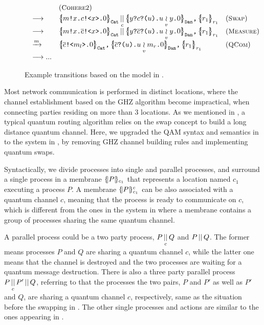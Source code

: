 \begin{figure}[t]
{\[\begin{array}{l}
\begin{array}{lll}
&
(\rulelab{Cohere2})
\\[0.3em]
\longrightarrow
&
\pard{\parll{\qcellb{\send{m}{x}{\csend{c}{x}{0}}}{\cn{Cat}}}{c}
{\qcellb{\rev{y}{\crev{c}{u}{\mer{u}{v}{y}{0}}}}{\cn{Dan}}}}
{\qcellb{r_1}{r_1}}
&
(\rulelab{Swap})
\\[0.3em]
\longrightarrow
&
\pard{\parl{\qcellb{\send{m}{x}{\csend{\overline{c}}{x}{0}}}{\cn{Cat}}}
{\qcellb{\rev{y}{\crev{\overline{c}}{u}{\mer{u}{v}{y}{0}}}}{\cn{Dan}}}}
{\qcellb{r_1}{r_1}}
&
(\rulelab{Measure})
\\[0.3em]
\xrightarrow{m}
&
\pard{\pard{\qcellb{\csend{\overline{c}}{m_l}{0}}{\cn{Cat}}}
{\qcellb{\crev{\overline{c}}{u}{\mer{u}{v}{m_r}{0}}}{\cn{Dan}}}}
{\qcellb{r_1}{r_1}}
&
(\rulelab{QCom})
\\[0.3em]
\longrightarrow...
\end{array}
\end{array}
\]
}
\caption{Example transitions based on the model in .}
  \label{fig:q-pi-example}
\end{figure}

Most network communication is performed in distinct locations,
where the channel establishment based on the GHZ algorithm become impractical, when connecting parties residing on more than $3$ locations. As we mentioned in , a typical quantum routing algorithm relies on the swap concept to build a long distance quantum channel. Here, we upgraded the QAM syntax and semantics in  to the system in , by removing GHZ channel building rules and implementing quantum swaps.

Syntactically, we divide processes into single and parallel processes, and surround a single process in a membrane $\{\!| P |\!\}_{c_1}$ that represents a location named $c_1$ executing a process $P$. A membrane $\{\!| P |\!\}_{c_1}^c$ can be also associated with a quantum channel $c$, meaning that the process is ready to communicate on $c$, which is different from the ones in the system in  where a membrane contains a group of processes sharing the same quantum channel.

A parallel process could be a two party process, $P\,\underset{c}{||}\,Q$ and $P\,||\,Q$.
The former means processes $P$ and $Q$ are sharing a quantum channel $c$, while the latter one means that the channel is destroyed and the two processes are waiting for a quantum message destruction.
There is also a three party parallel process $P\,\underset{c}{||}\,P'\,||\,Q$, referring to that the processes the two pairs, $P$ and $P'$ as well as $P'$ and $Q$, are sharing a quantum channel $c$, respectively, same as the situation before the swapping in . The other single processes and actions are similar to the ones appearing in .

